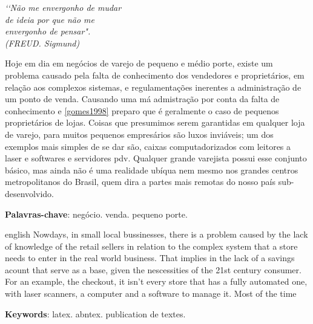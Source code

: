 \documentclass[12pt, openright, twoside, article, a4paper, english, brazil]{abntex2}
\begin{document}
\imprimircapa

\imprimirfolhaderosto

\begin{epigrafe}
\vspace*{\fill}
\begin{flushright}
\textit{‘‘Não me envergonho de mudar \\
de ideia por que não me \\
envergonho de pensar".\\
(FREUD. Sigmund)}
\end{flushright}
\end{epigrafe}
\clearpage

\tableofcontents*
\cleardoublepage

\textual
\begin{resumo}
  Hoje em dia em negócios de varejo de pequeno e médio porte, existe um problema
causado pela falta de conhecimento dos vendedores e proprietários, em relação
aos complexos sistemas, e regulamentações inerentes a administração de um ponto
de venda. Causando uma má admistração por conta da falta de conhecimento e
\ref{gomes1998}
preparo que é geralmente o caso de pequenos proprietários de lojas. Coisas que
presumimos serem garantidas em qualquer loja de varejo, para muitos pequenos
empresários são luxos inviáveis; um dos exemplos mais simples de se dar são,
caixas computadorizados com leitores a laser e softwares e servidores \gls{pdv}.
Qualquer grande varejista possui esse conjunto básico, mas ainda não é uma
realidade ubíqua nem mesmo nos grandes centros metropolitanos do Brasil, quem
dira a partes mais remotas do nosso país sub-desenvolvido. 
  
\vspace{\onelineskip}
\noindent
\textbf{Palavras-chave}: negócio. venda. pequeno porte.
\end{resumo}
\clearpage

\begin{resumo}[Resume]
\begin{otherlanguage*}{english}
Nowdays, in small local bussinesses, there is a problem caused by the lack of 
knowledge of the retail sellers in relation to the complex system that a 
store needs to enter in the real world business. That implies in the lack of a
savings acount that serve as a base, given the nescessities of the 21st century
consumer. For an example, the checkout, it isn't every store that has a fully
automated one, with laser scanners, a computer and a software to manage it. Most
of the time

\vspace{\onelineskip}
\noindent
\textbf{Keywords}: latex. abntex. publication de textes.
\end{otherlanguage*}
\end{resumo}
\end{document}
